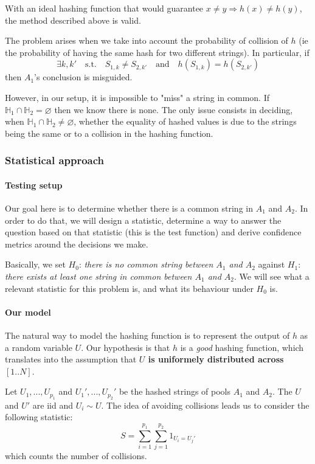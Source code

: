 \documentclass[usletter,11pt,final]{article}
\begin{document}
With an ideal hashing function that would guarantee $x \ne y \Rightarrow h(x) \ne h(y)$, the method described above is valid.

The problem arises when we take into account the probability of collision of $h$ (ie the probability of having the same hash for two different strings).  In particular, if $$\exists k,k' \quad \textrm{s.t.} \quad S_{1,k} \ne S_{2,k'} \quad \textrm{and} \quad h(S_{1,k}) = h(S_{2,k'})$$ then $A_1$'s conclusion is misguided.

However, in our setup, it is impossible to "miss" a string in common. If $\mathbb{H}_1 \cap \mathbb{H}_2 = \varnothing$ then we know there is none. The only issue consists in deciding, when $\mathbb{H}_1 \cap \mathbb{H}_2 \neq \varnothing$, whether the equality of hashed values is due to the strings being the same or to a collision in the hashing function.

\subsubsection{Statistical approach}

\paragraph{Testing setup}
Our goal here is to determine whether there is a common string in $A_1$ and $A_2$. In order to do that, we will design a statistic, determine a way to answer the question based on that statistic (this is the test function) and derive confidence metrics around the decisions we make.

Basically, we set $H_0$: \textit{there is no common string between $A_1$ and $A_2$} against $H_1$: \textit{there exists at least one string in common between $A_1$ and $A_2$}. We will see what a relevant statistic for this problem is, and what its behaviour under $H_0$ is.

\paragraph{Our model}
The natural way to model the hashing function is to represent the output of $h$ as a random variable $U$. Our hypothesis is that $h$ is a \textit{good} hashing function, which translates into the assumption that \textbf{$U$ is uniformely distributed across $[1 .. N]$}.

Let $U_1, ..., U_{p_1}$ and $U_1', ..., U_{p_2}'$ be the hashed strings of pools $A_1$ and $A_2$. The $U$ and $U'$ are iid and $U_i \sim U$.
The idea of avoiding collisions leads us to consider the following statistic: $$ S = \sum_{i=1}^{p_1} \sum_{j=1}^{p_2} 1_{U_i = U_j'} $$ which counts the number of collisions.
\end{document}
